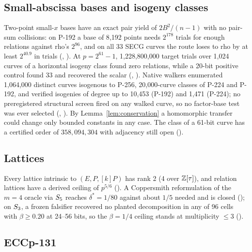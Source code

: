 \subsection{Small-abscissa bases and isogeny classes}

Two-point small-$x$ bases have an exact pair yield of $2B^2/(n-1)$ with no
pair-sum collisions: on P-192 a base of 8{,}192 points needs $2^{178}$ trials
for enough relations against rho's $2^{96}$, and on all 33 SECG curves the
route loses to rho by at least $2^{40.9}$ in trials
(,
). At $p=2^{61}-1$, 1{,}228{,}800{,}000
target trials over 1{,}024 curves of a horizontal isogeny class found zero
relations, while a 20-bit positive control found 33 and recovered the
scalar (,
). Native walkers enumerated
1{,}064{,}000 distinct curves isogenous to P-256, 20{,}000-curve classes of
P-224 and P-192, and verified isogenies of degree up to 10{,}453 (P-192) and
1{,}471 (P-224); no preregistered structural screen fired on any walked
curve, so no factor-base test was ever selected
(,
). By
Lemma~\ref{lem:conservation} a homomorphic transfer could change only
bounded constants in any case. The class of a 61-bit curve has a
certified order of $358{,}094{,}304$ with adjacency still open
().

\subsection{Lattices}

Every lattice intrinsic to $(E,P,[k]P)$ has rank 2 (4 over $\mathbb{Z}[\tau]$), and
relation lattices have a derived ceiling of $p^{5/6}$
().
A Coppersmith reformulation of the $m=4$ oracle via $S_{5}$ reaches
$\delta^*=1/80$ against about $1/5$ needed and is closed
(); on $S_{3}$, a
frozen falsifier recovered no planted decomposition in any of 96 cells with
$\beta\ge0.20$ at 24--56 bits, so the $\beta=1/4$ ceiling stands at
multiplicity $\le3$ ().

\subsection{ECCp-131}

